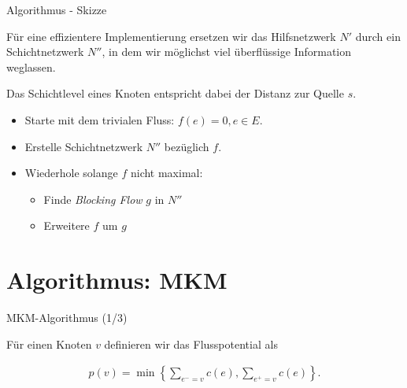 \documentclass[aspectratio=169]{beamer}
\begin{document}
\begin{frame}{Algorithmus - Skizze}

  Für eine effizientere Implementierung ersetzen wir das
  Hilfsnetzwerk $N'$ durch ein Schichtnetzwerk $N''$, in
  dem wir möglichst viel überflüssige Information weglassen.
  
  Das Schichtlevel eines Knoten entspricht dabei der Distanz zur Quelle $s$.


  \begin{algorithmus*}
    \begin{itemize}
      \item Starte mit dem trivialen Fluss: $f(e) = 0 , e \in E$.
      \item Erstelle Schichtnetzwerk $N''$ bezüglich $f$.
      \item Wiederhole solange $f$ nicht maximal:
      \begin{itemize}
        \item Finde \textit{Blocking Flow} $g$ in $N''$
        \item Erweitere $f$ um $g$
      \end{itemize}
    \end{itemize}
  \end{algorithmus*}

\end{frame}

\section{Algorithmus: MKM}

\begin{frame}{MKM-Algorithmus (1/3)}

  \begin{definition}[Flusspotential]
    Für einen Knoten $v$ definieren wir das Flusspotential als

    \begin{align*}
      p(v) = \min \left\{ \sum_{e^- = v} c(e), \sum_{e^+ = v} c(e) \right\}. 
    \end{align*}
  \end{definition}

  
  
\end{frame}
\end{document}
